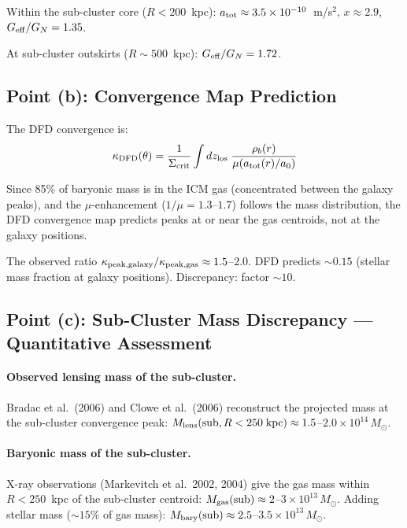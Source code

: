 \documentclass[11pt,a4paper]{article}
\newcommand{\Geff}{G_{\rm eff}}
\newcommand{\ee}[1]{\times 10^{#1}}
\begin{document}
Within the sub-cluster core ($R < 200$~kpc): $a_{\rm tot} \approx 3.5\ee{-10}$~m/s$^2$,
$x \approx 2.9$, $\Geff/G_N = 1.35$.

At sub-cluster outskirts ($R \sim 500$~kpc): $\Geff/G_N = 1.72$.

\subsection{Point (b): Convergence Map Prediction}

The DFD convergence is:
\begin{equation}
\kappa_{\rm DFD}(\theta) = \frac{1}{\Sigma_{\rm crit}}\int dz_{\rm los}\;
\frac{\rho_b(r)}{\mu(a_{\rm tot}(r)/a_0)}
\end{equation}

Since 85\% of baryonic mass is in the ICM gas (concentrated between the
galaxy peaks), and the $\mu$-enhancement ($1/\mu = 1.3$--$1.7$) follows the
mass distribution, the DFD convergence map predicts peaks at or near the gas
centroids, not at the galaxy positions.

The observed ratio $\kappa_{\rm peak,galaxy}/\kappa_{\rm peak,gas} \approx
1.5$--$2.0$.  DFD predicts $\sim 0.15$ (stellar mass fraction at galaxy
positions).  Discrepancy: factor $\sim 10$.

\subsection{Point (c): Sub-Cluster Mass Discrepancy --- Quantitative Assessment}

\paragraph{Observed lensing mass of the sub-cluster.}
Bradac et al.\ (2006) and Clowe et al.\ (2006) reconstruct the projected
mass at the sub-cluster convergence peak:
$M_{\rm lens}(\text{sub}, R < 250\;\text{kpc}) \approx 1.5$--$2.0 \times
10^{14}\,M_\odot$.

\paragraph{Baryonic mass of the sub-cluster.}
X-ray observations (Markevitch et al.\ 2002, 2004) give the gas mass within
$R < 250$~kpc of the sub-cluster centroid:
$M_{\rm gas}(\text{sub}) \approx 2$--$3 \times 10^{13}\,M_\odot$.
Adding stellar mass ($\sim 15\%$ of gas mass):
$M_{\rm bary}(\text{sub}) \approx 2.5$--$3.5 \times 10^{13}\,M_\odot$.
\end{document}

